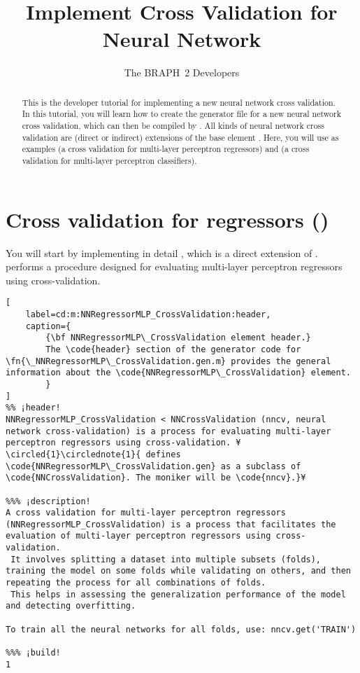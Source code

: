 \documentclass{tufte-handout}
\title{Implement Cross Validation for Neural Network}
\author[The BRAPH~2 Developers]{The BRAPH~2 Developers}
\begin{document}
\maketitle

\begin{abstract}
\noindent
This is the developer tutorial for implementing a new neural network cross validation. 
In this tutorial, you will learn how to create the generator file  for a new neural network cross validation, which can then be compiled by . All kinds of neural network cross validation are (direct or indirect) extensions of the base element . Here, you will use as examples  (a cross validation for multi-layer perceptron regressors) and  (a cross validation for multi-layer perceptron classifiers).
\end{abstract}

\tableofcontents

\clearpage

\section{Cross validation for regressors ()}

You will start by implementing in detail , which is a direct extension of .
 performs a procedure designed for evaluating multi-layer perceptron regressors using cross-validation. 

\begin{lstlisting}[
	label=cd:m:NNRegressorMLP_CrossValidation:header,
	caption={
		{\bf NNRegressorMLP\_CrossValidation element header.}
		The \code{header} section of the generator code for \fn{\_NNRegressorMLP\_CrossValidation.gen.m} provides the general information about the \code{NNRegressorMLP\_CrossValidation} element.
		}
]
%% ¡header!
NNRegressorMLP_CrossValidation < NNCrossValidation (nncv, neural network cross-validation) is a process for evaluating multi-layer perceptron regressors using cross-validation. ¥\circled{1}\circlednote{1}{ defines \code{NNRegressorMLP\_CrossValidation.gen} as a subclass of \code{NNCrossValidation}. The moniker will be \code{nncv}.}¥

%%% ¡description!
A cross validation for multi-layer perceptron regressors (NNRegressorMLP_CrossValidation) is a process that facilitates the evaluation of multi-layer perceptron regressors using cross-validation. 
 It involves splitting a dataset into multiple subsets (folds), training the model on some folds while validating on others, and then repeating the process for all combinations of folds. 
 This helps in assessing the generalization performance of the model and detecting overfitting.

To train all the neural networks for all folds, use: nncv.get('TRAIN')

%%% ¡build!
1
\end{lstlisting}
\end{document}
